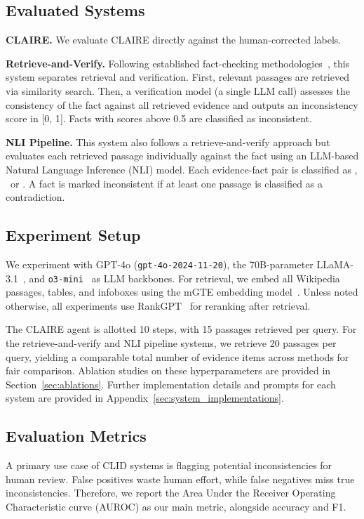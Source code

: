 \documentclass[11pt]{article}
\newcommand{\task}[0]{CLID\xspace}
\newcommand{\system}[0]{\textsc{CLAIRE}\xspace}
\newcommand{\supports}{%
\tcbox[colback=green!10,colframe=green!50!black,boxrule=0.3pt,arc=2pt,
top=-3.5pt,bottom=-3.5pt,left=0.5pt,right=0.5pt,
nobeforeafter,tcbox raise base]{\texttt{\strut Supports}}%
}
\newcommand{\refutes}{%
\tcbox[colback=red!10,colframe=red!50!black,boxrule=0.3pt,arc=2pt,
top=-3.5pt,bottom=-3.5pt,left=0.5pt,right=0.5pt,
nobeforeafter,tcbox raise base]{\texttt{\strut Refutes}}%
}
\newcommand{\nei}{%
\tcbox[colback=gray!10,colframe=gray!50!black,boxrule=0.3pt,arc=2pt,
top=-3.5pt,bottom=-3.5pt,left=0.5pt,right=0.5pt,
nobeforeafter,tcbox raise base]{\texttt{\strut Not Enough Information}}%
}
\begin{document}
\subsection{Evaluated Systems}

\textbf{\system.} We evaluate \system directly against the human-corrected labels.

\textbf{Retrieve-and-Verify.} Following established fact-checking methodologies~\citep{thorne-etal-2018-fever}, this system separates retrieval and verification. First, relevant passages are retrieved via similarity search. Then, a verification model (a single LLM call) assesses the consistency of the fact against all retrieved evidence and outputs an inconsistency score in [0, 1]. Facts with scores above 0.5 are classified as inconsistent.

\textbf{NLI Pipeline.} This system also follows a retrieve-and-verify approach but evaluates each retrieved passage individually against the fact using an LLM-based Natural Language Inference (NLI) model. Each evidence-fact pair is classified as \refutes, \supports~or \nei. A fact is marked inconsistent if at least one passage is classified as a contradiction.

\subsection{Experiment Setup}
We experiment with GPT-4o (\texttt{gpt-4o-2024-11-20}), the 70B-parameter LLaMA-3.1~\cite{grattafiori2024llama}, and \texttt{o3-mini}~\cite{openai2025o3} as LLM backbones. For retrieval, we embed all Wikipedia passages, tables, and infoboxes using the mGTE embedding model~\cite{zhang-etal-2024-mgte}. Unless noted otherwise, all experiments use RankGPT~\citep{sun-etal-2023-chatgpt} for reranking after retrieval.

The \system agent is allotted 10 steps, with 15 passages retrieved per query. For the retrieve-and-verify and NLI pipeline systems, we retrieve 20 passages per query, yielding a comparable total number of evidence items across methods for fair comparison. Ablation studies on these hyperparameters are provided in Section~\ref{sec:ablations}. Further implementation details and prompts for each system are provided in Appendix~\ref{sec:system_implementations}.

\subsection{Evaluation Metrics}
A primary use case of \task systems is flagging potential inconsistencies for human review. False positives waste human effort, while false negatives miss true inconsistencies. Therefore, we report the Area Under the Receiver Operating Characteristic curve (AUROC) as our main metric, alongside accuracy and F1.
\end{document}
